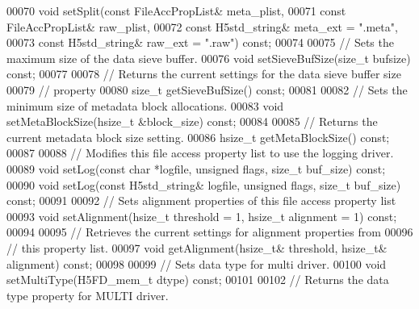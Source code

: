 \begin{DoxyCode}
00070         \textcolor{keywordtype}{void} setSplit(\textcolor{keyword}{const} FileAccPropList& meta\_plist,
00071                       \textcolor{keyword}{const} FileAccPropList& raw\_plist,
00072                       \textcolor{keyword}{const} H5std\_string& meta\_ext = \textcolor{stringliteral}{".meta"},
00073                       \textcolor{keyword}{const} H5std\_string& raw\_ext = \textcolor{stringliteral}{".raw"}) \textcolor{keyword}{const};
00074 
00075         \textcolor{comment}{// Sets the maximum size of the data sieve buffer.}
00076         \textcolor{keywordtype}{void} setSieveBufSize(\textcolor{keywordtype}{size\_t} bufsize) \textcolor{keyword}{const};
00077 
00078         \textcolor{comment}{// Returns the current settings for the data sieve buffer size}
00079         \textcolor{comment}{// property}
00080         \textcolor{keywordtype}{size\_t} getSieveBufSize() \textcolor{keyword}{const};
00081 
00082         \textcolor{comment}{// Sets the minimum size of metadata block allocations.}
00083         \textcolor{keywordtype}{void} setMetaBlockSize(hsize\_t &block\_size) \textcolor{keyword}{const};
00084 
00085         \textcolor{comment}{// Returns the current metadata block size setting.}
00086         hsize\_t getMetaBlockSize() \textcolor{keyword}{const};
00087 
00088         \textcolor{comment}{// Modifies this file access property list to use the logging driver.}
00089         \textcolor{keywordtype}{void} setLog(\textcolor{keyword}{const} \textcolor{keywordtype}{char} *logfile, \textcolor{keywordtype}{unsigned} flags, \textcolor{keywordtype}{size\_t} buf\_size) \textcolor{keyword}{const};
00090         \textcolor{keywordtype}{void} setLog(\textcolor{keyword}{const} H5std\_string& logfile, \textcolor{keywordtype}{unsigned} flags, \textcolor{keywordtype}{size\_t} buf\_size) \textcolor{keyword}{const};
00091 
00092         \textcolor{comment}{// Sets alignment properties of this file access property list}
00093         \textcolor{keywordtype}{void} setAlignment(hsize\_t threshold = 1, hsize\_t alignment = 1) \textcolor{keyword}{const};
00094 
00095         \textcolor{comment}{// Retrieves the current settings for alignment properties from}
00096         \textcolor{comment}{// this property list.}
00097         \textcolor{keywordtype}{void} getAlignment(hsize\_t& threshold, hsize\_t& alignment) \textcolor{keyword}{const};
00098 
00099         \textcolor{comment}{// Sets data type for multi driver.}
00100         \textcolor{keywordtype}{void} setMultiType(H5FD\_mem\_t dtype) \textcolor{keyword}{const};
00101 
00102         \textcolor{comment}{// Returns the data type property for MULTI driver.}

\end{DoxyCode}
